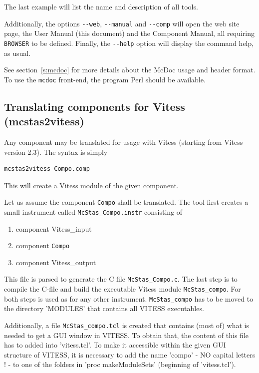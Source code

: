 The last example will list the name and description of all \MCS tools.

Additionally, the options \verb+--web+, \verb+--manual+ and \verb+--comp+ will
open the \MCS web site page, the User Manual (this document) and the Component
Manual, all requiring \verb+BROWSER+ to be defined. Finally, the \verb+--help+
option will display the command help, as usual.

See section~\ref{s:mcdoc} for more details about the McDoc usage and header
format.  To use the \verb+mcdoc+ front-end, the program Perl should be
available.

\subsection{Translating \MCS components for Vitess (mcstas2vitess)}
\label{s:mcstas2vitess}

Any \MCS component may be translated for usage with Vitess (starting from
Vitess version 2.3). The syntax is simply 
\begin{lstlisting}
mcstas2vitess Compo.comp
\end{lstlisting}
This will create a Vitess module of the given component.

Let us assume the component \verb+Compo+ shall be translated. The tool first
creates a small instrument called \verb+McStas_Compo.instr+ consisting of
\begin{enumerate}
\item component Vitess\_input
\item component \verb+Compo+
\item component Vitess\_output
\end{enumerate}

This file is parsed to generate the C file \verb+McStas_Compo.c+. The last step
is to compile the C-file and build the executable Vitess module
\verb'McStas_compo'. For both steps \MCS is used as for any other
instrument. \verb'McStas_compo' has to be moved to the directory 'MODULES' that
contains all VITESS executables.

Additionally, a file \verb'McStas_compo.tcl' is created that contains (most of)
what is needed to get a GUI window in VITESS. To obtain that, the content of
this file has to added into 'vitess.tcl'. To make it accessible within the given
GUI structure of VITESS, it is necessary to add the name 'compo' - NO capital
letters ! - to one of the folders in 'proc makeModuleSets{}' (beginning of
'vitess.tcl').

